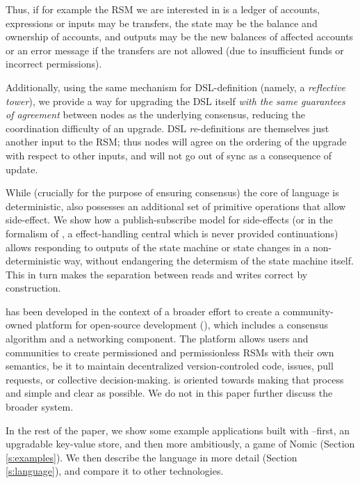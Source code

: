 Thus, if for example the RSM we are interested
in is a ledger of accounts, expressions or inputs may be transfers, the
state may be the balance and ownership of accounts, and outputs may be the new
balances of affected accounts or an error message if the transfers are not
allowed (due to insufficient funds or incorrect permissions).

Additionally, using the same mechanism for DSL-definition (namely, a
\textit{reflective tower}), we provide a way for upgrading the DSL itself
\textit{with the same guarantees of agreement} between nodes as the underlying
consensus, reducing the coordination difficulty of an upgrade. DSL
\textit{re}-definitions are themselves just another input to the RSM; thus
nodes will agree on the ordering of the upgrade with respect to other inputs,
and will not go out of sync as a consequence of update.

While (crucially for the purpose of ensuring consensus) the core of language is
deterministic, \rad also possesses an additional set of primitive operations
that allow side-effect. We show how a publish-subscribe model for side-effects
(or in the formalism of \cite{Cartwright1994}, a effect-handling central which
is never provided continuations) allows responding to outputs of the state
machine or state changes in a non-deterministic way, without endangering the
determism of the state machine itself. This in turn makes the separation
between reads and writes correct by construction.

\rad has been developed in the context of a broader effort to create a
community-owned platform for open-source development (\oscoin{}), which
includes a consensus algorithm and a networking component. The \oscoin{}
platform allows users and communities to create permissioned and permissionless
RSMs with their own semantics, be it to maintain decentralized
version-controled code, issues, pull requests, or collective decision-making. \rad is
oriented towards making that process and simple and clear as possible. We do
not in this paper further discuss the broader \oscoin{} system.

In the rest of the paper, we show some example applications built with
\rad--first, an upgradable key-value store, and then more ambitiously, a game
of Nomic (Section \ref{s:examples}). We then describe the language in more
detail (Section \ref{s:language}), and compare it to other technologies.
